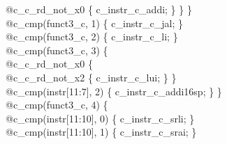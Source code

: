 {\indent \hspace{\parindent} \hspace{\parindent}	\hspace{\parindent} \hspace{\parindent}	@c\_c\_rd\_not\_x0 \{ c\_instr\_c\_addi; \} \} \}\\%
\indent \hspace{\parindent} \hspace{\parindent} @c\_cmp(funct3\_c, 1) \{ c\_instr\_c\_jal; \}\\%
\indent \hspace{\parindent} \hspace{\parindent} @c\_cmp(funct3\_c, 2) \{ c\_instr\_c\_li; \}\\%
\indent \hspace{\parindent} \hspace{\parindent} @c\_cmp(funct3\_c, 3) \{\\%
\indent \hspace{\parindent} \hspace{\parindent} \hspace{\parindent} @c\_c\_rd\_not\_x0 \{\\%
\indent \hspace{\parindent} \hspace{\parindent} \hspace{\parindent} \hspace{\parindent} @c\_c\_rd\_not\_x2 \{ c\_instr\_c\_lui; \} \}\\%
\indent \hspace{\parindent} \hspace{\parindent}	\hspace{\parindent}@c\_cmp(instr[11:7], 2) \{ c\_instr\_c\_addi16sp; \} \}\\%
\indent \hspace{\parindent} \hspace{\parindent} @c\_cmp(funct3\_c, 4) \{\\%
\indent \hspace{\parindent} \hspace{\parindent} \hspace{\parindent} @c\_cmp(instr[11:10], 0) \{ c\_instr\_c\_srli; \}\\%
\indent \hspace{\parindent} \hspace{\parindent} \hspace{\parindent} @c\_cmp(instr[11:10], 1) \{ c\_instr\_c\_srai; \}\\%
}
